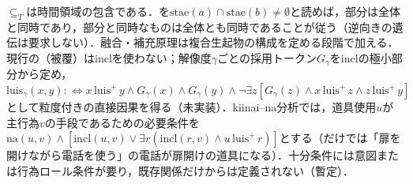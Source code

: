 \documentclass[../../main-detail.tex]{subfiles}
\begin{document}
$\subseteq_T$は時間領域の包含である．を$\mathrm{stae}(a)\cap\mathrm{stae}(b)\neq\emptyset$と読めば，部分は全体と同時であり，部分と同時なものは全体とも同時であることが従う（逆向きの遺伝は要求しない）．融合・補充原理は複合生起物の構成を定める段階で加える．現行の（被覆）は$\mathrm{incl}$を使わない；解像度$\gamma$ごとの採用トークン$G_\gamma$を$\mathrm{incl}$の極小部分から定め，$\mathrm{luis}_\gamma(x,y):\Longleftrightarrow x\,\mathrm{luis}^{+}\,y\land G_\gamma(x)\land G_\gamma(y)\land\lnot\exists z[G_\gamma(z)\land x\,\mathrm{luis}^{+}\,z\land z\,\mathrm{luis}^{+}\,y]$として粒度付きの直接因果を得る（未実装）．kiinai--na分析では，道具使用$u$が主行為$v$の手段であるための必要条件を$\mathrm{na}(u,v)\land[\mathrm{incl}(u,v)\lor\exists r(\mathrm{incl}(r,v)\land u\,\mathrm{luis}^{+}\,r)]$とする（だけでは「扉を開けながら電話を使う」の電話が扉開けの道具になる）．十分条件には意図または行為ロール条件が要り，既存関係だけからは定義されない（暫定）．
\end{document}
